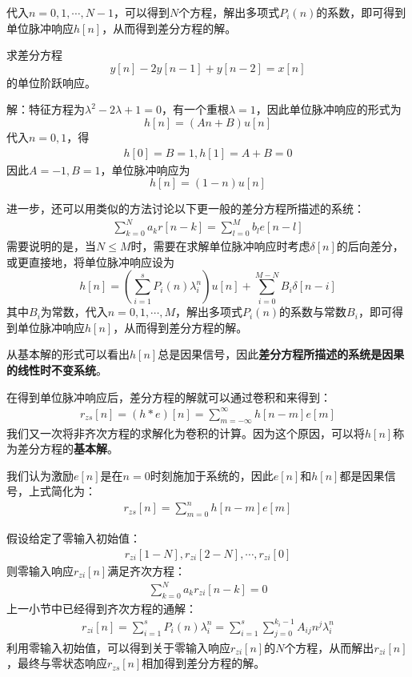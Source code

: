 代入$n=0,1,\cdots,N-1$，可以得到$N$个方程，解出多项式$P_i(n)$的系数，即可得到单位脉冲响应$h[n]$，从而得到差分方程的解。

\begin{example}
    求差分方程
    $$y[n]-2y[n-1]+y[n-2]=x[n]$$
    的单位阶跃响应。

    解：特征方程为$\lambda^2-2\lambda+1=0$，有一个重根$\lambda=1$，因此单位脉冲响应的形式为
    $$h[n]=(A n+B)u[n]$$
    代入$n=0,1$，得\begin{align*}
    h[0]=B=1,h[1]=A+B=0
    \end{align*}
    因此$A=-1,B=1$，单位脉冲响应为
    $$h[n]=(1-n)u[n]$$
\end{example}

进一步，还可以用类似的方法讨论以下更一般的差分方程所描述的系统：
\begin{align*}
    \sum_{k=0}^{N}a_k r[n-k] = \sum_{l=0}^{M}b_l e[n-l]
\end{align*}
需要说明的是，当$N\leq M$时，需要在求解单位脉冲响应时考虑$\delta[n]$的后向差分，或更直接地，将单位脉冲响应设为
$$h[n]=\left(\sum_{i=1}^s P_i(n) \lambda_i^n \right)u[n]+\sum_{i=0}^{M-N}B_i\delta[n-i]$$
其中$B_i$为常数，代入$n=0,1,\cdots,M$，解出多项式$P_i(n)$的系数与常数$B_i$，即可得到单位脉冲响应$h[n]$，从而得到差分方程的解。

从基本解的形式可以看出$h[n]$总是因果信号，因此\textbf{差分方程所描述的系统是因果的线性时不变系统}。

在得到单位脉冲响应后，差分方程的解就可以通过卷积和来得到：
\begin{align*}
    r_{zs}[n]=(h*e)[n]=\sum_{m=-\infty}^{\infty}h[n-m]e[m]
\end{align*}
我们又一次将非齐次方程的求解化为卷积的计算。因为这个原因，可以将$h[n]$称为差分方程的\textbf{基本解}。

我们认为激励$e[n]$是在$n=0$时刻施加于系统的，因此$e[n]$和$h[n]$都是因果信号，上式简化为：
\begin{align*}
    r_{zs}[n]=\sum_{m=0}^{n}h[n-m]e[m]
\end{align*}

假设给定了零输入初始值：
\begin{align*}
    r_{zi}[1-N],r_{zi}[2-N],\cdots,r_{zi}[0]
\end{align*}
则零输入响应$r_{zi}[n]$满足齐次方程：
\begin{align*}
    \sum_{k=0}^{N}a_k r_{zi}[n-k] = 0
\end{align*}
上一小节中已经得到齐次方程的通解：
\begin{align*}
    r_{zi}[n]=\sum_{i=1}^{s}P_i(n) \lambda_i^n=\sum_{i=1}^{s}\sum_{j=0}^{k_i-1}A_{ij} n^j \lambda_i^n
\end{align*}
利用零输入初始值，可以得到关于零输入响应$r_{zi}[n]$的$N$个方程，从而解出$r_{zi}[n]$，最终与零状态响应$r_{zs}[n]$相加得到差分方程的解。

